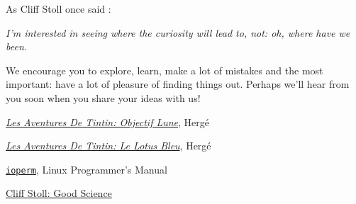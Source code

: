 \documentclass[12pt]{report}
\begin{document}
As Cliff Stoll once said \cite{cliff_stoll}: 

\textit{I'm interested in seeing where the curiosity will lead to, not: oh, where have we been.}

We encourage you to explore, learn, make a lot of mistakes and the most important: have a lot of pleasure of finding things out. Perhaps we'll hear from you soon when you share your ideas with us!

\newpage

\begin{thebibliography}{50}

 \hyperlink{https://fr.wikipedia.org/wiki/Objectif_Lune}{\textit{Les Aventures De Tintin: Objectif Lune}}, Hergé

 \hyperlink{https://fr.wikipedia.org/wiki/Le_Lotus_bleu}{\textit{Les Aventures De Tintin: Le Lotus Bleu}}, Hergé

 \hyperlink{http://man7.org/linux/man-pages/man2/ioperm.2.html}{\texttt{ioperm}}, Linux Programmer's Manual

 \hyperlink{https://www.youtube.com/watch?v=xHEIOgONq6A}{Cliff Stoll: Good Science}

\end{thebibliography}
\end{document}
